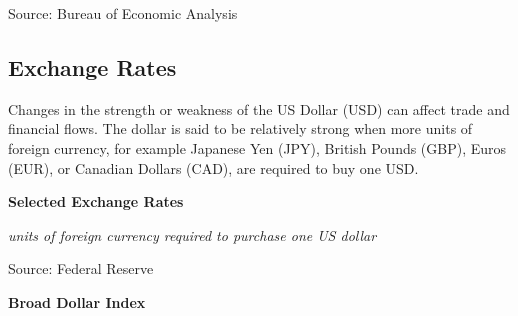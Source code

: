 \documentclass{report}
\makeatletter
\newcommand{\tbllink}[1]{\href{https://raw.githubusercontent.com/bdecon/US-chartbook/master/chartbook/data/#1}{\faTable}}
\newcommand*\short[1]{\expandafter\@gobbletwo\number\numexpr#1\relax}
\newcommand{\stdnode}[3]{\node[below, align=left, shift=({#1,#2})]{#3};}
\newcommand{\dateaxisticks}{
		date coordinates in=x, axis line style={draw=none},
		xmax={2020-10-01},
		max space between ticks=40,	    
		xtick={{1990-01-01}, {1992-01-01}, {1994-01-01}, 
			{1996-01-01}, {1998-01-01}, {2000-01-01}, 
			{2002-01-01}, {2004-01-01}, {2006-01-01},
			{2008-01-01}, {2010-01-01}, {2012-01-01}, {2014-01-01},
		    {2016-01-01}, {2018-01-01}, {2020-01-01}},
		minor xtick={{1989-01-01}, {1991-01-01}, {1993-01-01},
			{1995-01-01}, {1997-01-01}, {1999-01-01}, 
			{2001-01-01}, {2003-01-01}, {2005-01-01}, {2007-01-01},
		    {2009-01-01}, {2011-01-01}, {2013-01-01}, {2015-01-01},
		    {2017-01-01}, {2019-01-01}},
		enlarge y limits={0.06}, enlarge x limits={0.01},
		}
\newcommand{\bbar}[2]{extra #1 ticks = {{#2}}, extra #1 tick labels = ,
		extra #1 tick style = {grid=major, grid style={thick, black!25}},}
\newcommand{\stdline}[4]{\addplot[very thick, no markers, color=#1] 
		table [x=#2, y=#3, col sep=comma] {#4};	}
\newcommand{\rbars}{
		\fill[color=black!10] (axis cs:{1990-07-01},\pgfkeysvalueof{/pgfplots/ymin}) rectangle 
			(axis cs:{1991-03-01}, \pgfkeysvalueof{/pgfplots/ymax});
		\fill[color=black!10] (axis cs:{2007-12-01},\pgfkeysvalueof{/pgfplots/ymin}) rectangle 
			(axis cs:{2009-07-01}, \pgfkeysvalueof{/pgfplots/ymax});
		\fill[color=black!10] (axis cs:{2001-03-01},\pgfkeysvalueof{/pgfplots/ymin}) rectangle 
			(axis cs:{2001-11-01}, \pgfkeysvalueof{/pgfplots/ymax});
		\fill[color=black!10] (axis cs:{2020-02-01},\pgfkeysvalueof{/pgfplots/ymin}) rectangle 
			(axis cs:{2020-10-01}, \pgfkeysvalueof{/pgfplots/ymax});}
\makeatother
\begin{document}
{{{{{{\begin{minipage}{0.76\textwidth}
\footnotesize{Source: Bureau of Economic Analysis} \hfill \tbllink{iip.csv}
\end{minipage}

\newpage

\begin{minipage}{0.76\textwidth}

\subsection*{\color{black!70} \seriffont Exchange Rates}

\small Changes in the strength or weakness of the US Dollar (USD) can affect trade and financial flows. The dollar is said to be relatively strong when more units of foreign currency, for example Japanese Yen (JPY), British Pounds (GBP), Euros (EUR), or Canadian Dollars (CAD), are required to buy one USD.\\



\vspace{4mm}

\normalsize \textbf{Selected Exchange Rates}

\footnotesize{\textit{units of foreign currency required to purchase one US dollar}}

\hspace*{-2mm} 

\footnotesize{Source: Federal Reserve} \hfill \tbllink{fx1.csv}
\end{minipage}

\vspace{4mm}
\begin{minipage}{0.33\textwidth}
\normalsize \textbf{Broad Dollar Index}


\end{minipage}}}}}}}
\end{document}
